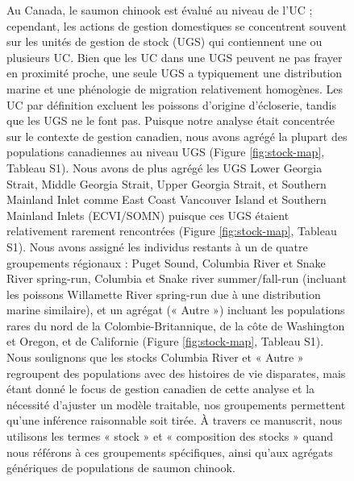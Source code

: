 \begin{figure}[H]
Au Canada, le saumon chinook est évalué au niveau de l'UC \citep{holtbyConservationUnitsPacific2007} ; cependant, les actions de gestion domestiques se concentrent souvent sur les unités de gestion de stock (UGS) qui contiennent une ou plusieurs UC. Bien que les UC dans une UGS peuvent ne pas frayer en proximité proche, une seule UGS a typiquement une distribution marine et une phénologie de migration relativement homogènes. Les UC par définition excluent les poissons d'origine d'écloserie, tandis que les UGS ne le font pas. Puisque notre analyse était concentrée sur le contexte de gestion canadien, nous avons agrégé la plupart des populations canadiennes au niveau UGS (Figure \ref{fig:stock-map}, Tableau S1). Nous avons de plus agrégé les UGS Lower Georgia Strait, Middle Georgia Strait, Upper Georgia Strait, et Southern Mainland Inlet comme East Coast Vancouver Island et Southern Mainland Inlets (ECVI/SOMN) puisque ces UGS étaient relativement rarement rencontrées (Figure \ref{fig:stock-map}, Tableau S1). Nous avons assigné les individus restants à un de quatre groupements régionaux : Puget Sound, Columbia River et Snake River spring-run, Columbia et Snake river summer/fall-run (incluant les poissons Willamette River spring-run due à une distribution marine similaire), et un agrégat (« Autre ») incluant les populations rares du nord de la Colombie-Britannique, de la côte de Washington et Oregon, et de Californie (Figure \ref{fig:stock-map}, Tableau S1). Nous soulignons que les stocks Columbia River et « Autre » regroupent des populations avec des histoires de vie disparates, mais étant donné le focus de gestion canadien de cette analyse et la nécessité d'ajuster un modèle traitable, nos groupements permettent qu'une inférence raisonnable soit tirée. À travers ce manuscrit, nous utilisons les termes « stock » et « composition des stocks » quand nous référons à ces groupements spécifiques, ainsi qu'aux agrégats génériques de populations de saumon chinook.


\end{figure}
